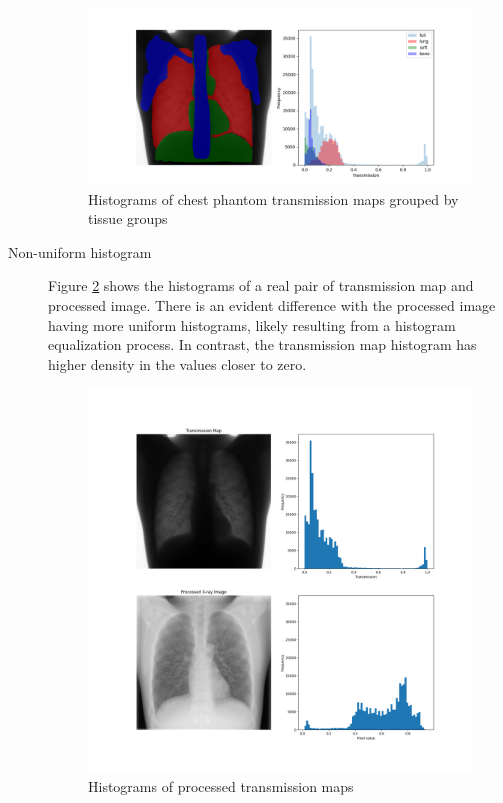 \documentclass[nomenclature, english, bibtex]{kththesis}
\numberwithin{listing}{chapter}
\begin{document}
\begin{description}
    \begin{figure}[H]
        \centering
        \includegraphics[width=1.0\textwidth]{figures/segmentation_txm_histograms.png}
        \caption{Histograms of chest phantom transmission maps grouped by tissue groups}
        \label{fig:segmentationTransmissionMapsHistograms}
    \end{figure}

    \item[Non-uniform histogram] Figure \ref{fig:processedHistogramCompare} shows the histograms of a real pair of transmission map
    and processed image. There is an evident difference with the processed image having more uniform histograms,
    likely resulting from a histogram equalization process. In contrast, the transmission map histogram has higher
    density in the values closer to zero.
    \begin{figure}[H]
        \centering
        \includegraphics[width=1.0\textwidth]{figures/processed_hist_cmp.png}
        \caption{Histograms of processed transmission maps}
        \label{fig:processedHistogramCompare}
    \end{figure}
\end{description}
\end{document}
